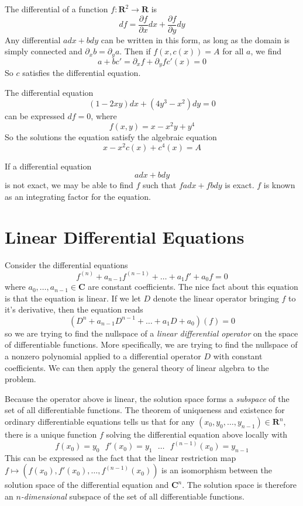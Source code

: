 The differential of a function $f: \mathbf{R}^2 \to \mathbf{R}$ is
%
\[ df = \frac{\partial f}{\partial x} dx + \frac{\partial f}{\partial y} dy \]
%
Any differential $a dx + b dy$ can be written in this form, as long as the domain is simply connected and $\partial_x b = \partial_y a$. Then if $f(x,c(x)) = A$ for all $a$, we find
%
\[ a + b c' = \partial_x f + \partial_y f c'(x) = 0 \]
%
So $c$ satisfies the differential equation.

\begin{example}
    The differential equation
    \[ (1 - 2xy) dx + (4y^3 - x^2) dy = 0 \]
    can be expressed $df = 0$, where
    \[ f(x,y) = x - x^2y + y^4 \]
    So the solutions the equation satisfy the algebraic equation
    \[ x - x^2 c(x) + c^4(x) = A \]
\end{example}

If a differential equation
%
\[ a dx + b dy \]
%
is not exact, we may be able to find $f$ such that $f a dx + f b dy$ is exact. $f$ is known as an integrating factor for the equation.

\section{Linear Differential Equations}

Consider the differential equations
%
\[ f^{(n)} + a_{n-1}f^{(n-1)} + \dots + a_1f' + a_0f = 0 \]
%
where $a_0, \dots, a_{n-1} \in \mathbf{C}$ are constant coefficients. The nice fact about this equation is that the equation is linear. If we let $D$ denote the linear operator bringing $f$ to it's derivative, then the equation reads
%
\[ (D^n + a_{n-1}D^{n-1} + \dots + a_1D + a_0)(f) = 0 \]
%
so we are trying to find the nullspace of a {\it linear differential operator} on the space of differentiable functions. More specifically, we are trying to find the nullspace of a nonzero polynomial applied to a differential operator $D$ with constant coefficients. We can then apply the general theory of linear algebra to the problem.

Because the operator above is linear, the solution space forms a {\it subspace} of the set of all differentiable functions. The theorem of uniqueness and existence for ordinary differentiable equations tells us that for any $(x_0,y_0, \dots, y_{n-1}) \in \mathbf{R}^n$, there is a unique function $f$ solving the differential equation above locally with
%
\[ f(x_0) = y_0\ \ \ f'(x_0) = y_1\ \ \ \dots\ \ \ f^{(n-1)}(x_0) = y_{n-1} \]
%
This can be expressed as the fact that the linear restriction map $f \mapsto (f(x_0), f'(x_0), \dots, f^{(n-1)}(x_0))$ is an isomorphism between the solution space of the differential equation and $\mathbf{C}^n$. The solution space is therefore an {\it $n$-dimensional} subspace of the set of all differentiable functions.

